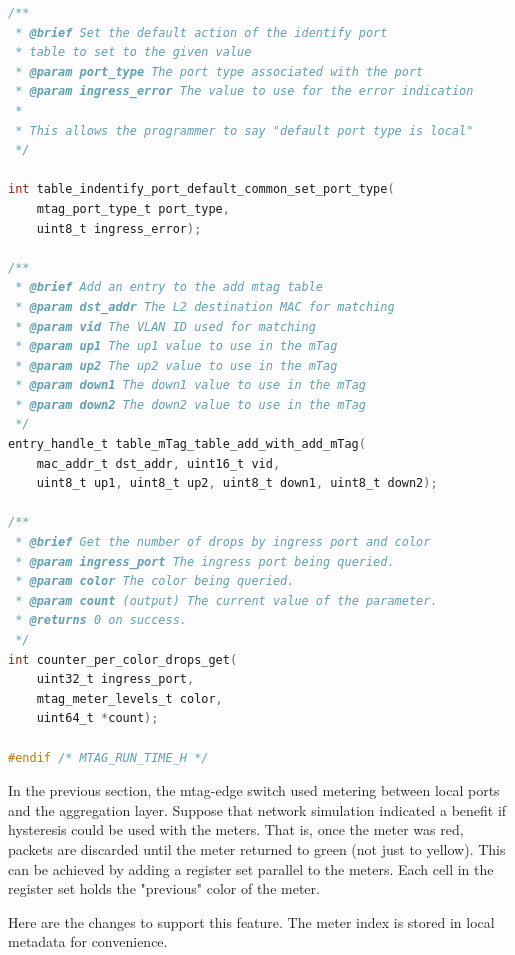 \documentclass[12pt]{article}
\begin{document}
\begin{lstlisting}[language=C,frame=single]
/**
 * @brief Set the default action of the identify port
 * table to set to the given value
 * @param port_type The port type associated with the port
 * @param ingress_error The value to use for the error indication
 *
 * This allows the programmer to say "default port type is local"
 */

int table_indentify_port_default_common_set_port_type(
    mtag_port_type_t port_type,
    uint8_t ingress_error);

/**
 * @brief Add an entry to the add mtag table
 * @param dst_addr The L2 destination MAC for matching
 * @param vid The VLAN ID used for matching
 * @param up1 The up1 value to use in the mTag
 * @param up2 The up2 value to use in the mTag
 * @param down1 The down1 value to use in the mTag
 * @param down2 The down2 value to use in the mTag
 */
entry_handle_t table_mTag_table_add_with_add_mTag(
    mac_addr_t dst_addr, uint16_t vid,
    uint8_t up1, uint8_t up2, uint8_t down1, uint8_t down2);

/**
 * @brief Get the number of drops by ingress port and color
 * @param ingress_port The ingress port being queried.
 * @param color The color being queried.
 * @param count (output) The current value of the parameter.
 * @returns 0 on success.
 */
int counter_per_color_drops_get(
    uint32_t ingress_port,
    mtag_meter_levels_t color,
    uint64_t *count);

#endif /* MTAG_RUN_TIME_H */
\end{lstlisting}


In the previous section, the mtag-edge switch used metering between local 
ports and the aggregation layer. Suppose that network simulation indicated 
a benefit if hysteresis could be used with the meters. That is, once the meter 
was red, packets are discarded until the meter returned to green (not just 
to yellow).
This can be achieved by adding a register set parallel to the meters. Each 
cell in the register set holds the "previous" color of the meter. 

Here are the changes to support this feature. The meter index is stored in 
local metadata for convenience.
\end{document}
